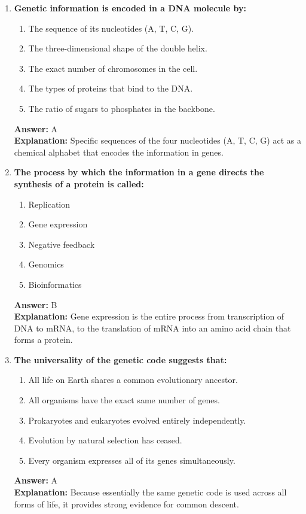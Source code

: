 \documentclass[11pt, a4paper]{article}
\begin{document}
\begin{enumerate}
\item \textbf{Genetic information is encoded in a DNA molecule by:}
\begin{enumerate}[label=\Alph*.]
    \item The sequence of its nucleotides (A, T, C, G).
    \item The three-dimensional shape of the double helix.
    \item The exact number of chromosomes in the cell.
    \item The types of proteins that bind to the DNA.
    \item The ratio of sugars to phosphates in the backbone.
\end{enumerate}
\textbf{Answer:} A \\
\textbf{Explanation:} Specific sequences of the four nucleotides (A, T, C, G) act as a chemical alphabet that encodes the information in genes.

\item \textbf{The process by which the information in a gene directs the synthesis of a protein is called:}
\begin{enumerate}[label=\Alph*.]
    \item Replication
    \item Gene expression
    \item Negative feedback
    \item Genomics
    \item Bioinformatics
\end{enumerate}
\textbf{Answer:} B \\
\textbf{Explanation:} Gene expression is the entire process from transcription of DNA to mRNA, to the translation of mRNA into an amino acid chain that forms a protein.

\item \textbf{The universality of the genetic code suggests that:}
\begin{enumerate}[label=\Alph*.]
    \item All life on Earth shares a common evolutionary ancestor.
    \item All organisms have the exact same number of genes.
    \item Prokaryotes and eukaryotes evolved entirely independently.
    \item Evolution by natural selection has ceased.
    \item Every organism expresses all of its genes simultaneously.
\end{enumerate}
\textbf{Answer:} A \\
\textbf{Explanation:} Because essentially the same genetic code is used across all forms of life, it provides strong evidence for common descent.


\end{enumerate}
\end{document}
